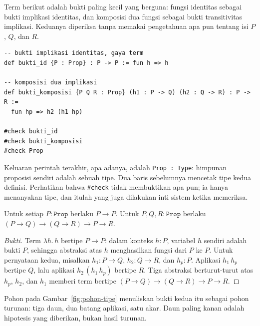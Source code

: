 
Term berikut adalah bukti paling kecil yang berguna: fungsi identitas sebagai bukti implikasi
identitas, dan komposisi dua fungsi sebagai bukti transitivitas implikasi. Keduanya diperiksa
tanpa memakai pengetahuan apa pun tentang isi $P$, $Q$, dan $R$.

\begin{verbatim}
-- bukti implikasi identitas, gaya term
def bukti_id {P : Prop} : P -> P := fun h => h

-- komposisi dua implikasi
def bukti_komposisi {P Q R : Prop} (h1 : P -> Q) (h2 : Q -> R) : P -> R :=
  fun hp => h2 (h1 hp)

#check bukti_id
#check bukti_komposisi
#check Prop
\end{verbatim}

Keluaran perintah terakhir, apa adanya, adalah \texttt{Prop : Type}: himpunan proposisi sendiri
adalah sebuah tipe. Dua baris sebelumnya mencetak tipe kedua definisi. Perhatikan bahwa
\texttt{\#check} tidak membuktikan apa pun; ia hanya menanyakan tipe, dan itulah yang juga
dilakukan inti sistem ketika memeriksa.

\begin{proposisi}
Untuk setiap $P:\mathtt{Prop}$ berlaku $P\to P$. Untuk $P,Q,R:\mathtt{Prop}$ berlaku
$(P\to Q)\to(Q\to R)\to P\to R$.
\end{proposisi}

\begin{proof}[Bukti]
Term $\lambda h.\,h$ bertipe $P\to P$: dalam konteks $h:P$, variabel $h$ sendiri adalah bukti $P$,
sehingga abstraksi atas $h$ menghasilkan fungsi dari $P$ ke $P$. Untuk pernyataan kedua, misalkan
$h_{1}:P\to Q$, $h_{2}:Q\to R$, dan $h_{p}:P$. Aplikasi $h_{1}\,h_{p}$ bertipe $Q$, lalu aplikasi
$h_{2}\,(h_{1}\,h_{p})$ bertipe $R$. Tiga abstraksi berturut-turut atas $h_{p}$, $h_{2}$, dan
$h_{1}$ memberi term bertipe $(P\to Q)\to(Q\to R)\to P\to R$.
\end{proof}

Pohon pada Gambar~\ref{fig:pohon-tipe} menuliskan bukti kedua itu sebagai pohon turunan: tiga daun,
dua batang aplikasi, satu akar. Daun paling kanan adalah hipotesis yang diberikan, bukan hasil
turunan.

